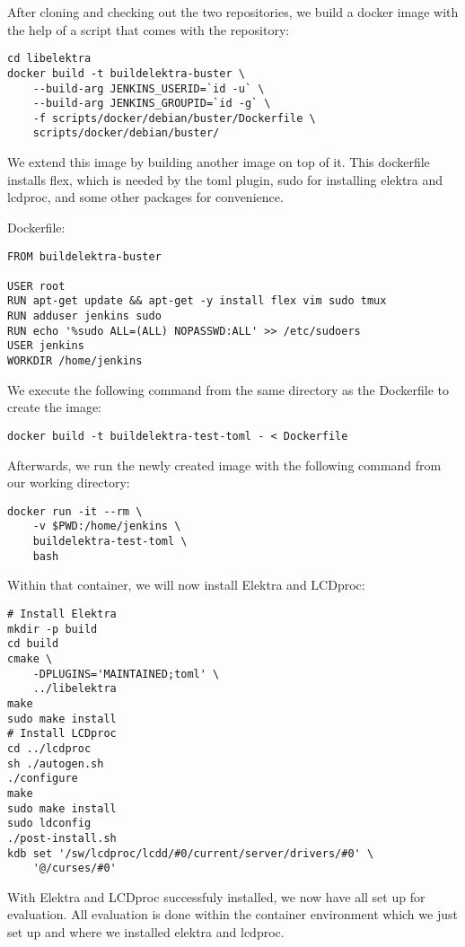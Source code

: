 \documentclass[12pt]{report}
\begin{document}
After cloning and checking out the two repositories, we build a docker image with the help of a script that comes with the repository:
\begin{tcolorbox}
\begin{verbatim}
cd libelektra
docker build -t buildelektra-buster \
    --build-arg JENKINS_USERID=`id -u` \
    --build-arg JENKINS_GROUPID=`id -g` \
    -f scripts/docker/debian/buster/Dockerfile \
    scripts/docker/debian/buster/
\end{verbatim}
\end{tcolorbox}

We extend this image by building another image on top of it. This dockerfile installs flex, which is needed by the toml plugin, sudo for installing elektra and lcdproc, and some other packages for convenience.

Dockerfile:
\begin{tcolorbox}
\small
\begin{verbatim}
FROM buildelektra-buster

USER root
RUN apt-get update && apt-get -y install flex vim sudo tmux
RUN adduser jenkins sudo
RUN echo '%sudo ALL=(ALL) NOPASSWD:ALL' >> /etc/sudoers
USER jenkins
WORKDIR /home/jenkins
\end{verbatim}
\end{tcolorbox}

We execute the following command from the same directory as the Dockerfile to create the image:
\begin{tcolorbox}
\small
\begin{verbatim}
docker build -t buildelektra-test-toml - < Dockerfile
\end{verbatim}
\end{tcolorbox}

Afterwards, we run the newly created image with the following command from our working directory:
\begin{tcolorbox}
\small
\begin{verbatim}
docker run -it --rm \
    -v $PWD:/home/jenkins \
    buildelektra-test-toml \
    bash
\end{verbatim}
\end{tcolorbox}

Within that container, we will now install Elektra and LCDproc:
\begin{tcolorbox}
\small
\begin{verbatim}
# Install Elektra
mkdir -p build
cd build
cmake \
    -DPLUGINS='MAINTAINED;toml' \
    ../libelektra
make
sudo make install
# Install LCDproc
cd ../lcdproc
sh ./autogen.sh
./configure
make
sudo make install
sudo ldconfig
./post-install.sh
kdb set '/sw/lcdproc/lcdd/#0/current/server/drivers/#0' \
    '@/curses/#0'
\end{verbatim}
\end{tcolorbox}
With Elektra and LCDproc successfuly installed, we now have all set up for evaluation.
All evaluation is done within the container environment which we just set up and where we installed elektra and lcdproc.
\end{document}

